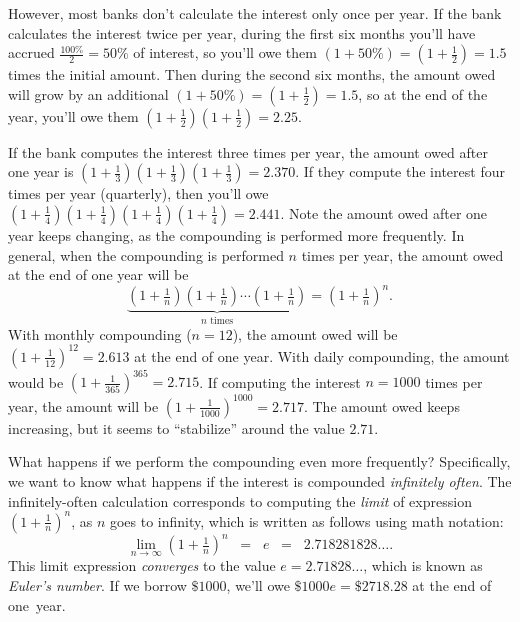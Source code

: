 		However,
		most banks don't calculate the interest only once per year.
		If the bank calculates the interest twice per year,
		during the first six months you'll have accrued $\frac{100\%}{2} = 50\%$ of interest,
		so you'll owe them $(1+50\%) = (1+\frac{1}{2}) = 1.5$ times the initial amount.
		Then during the second six months,
		the amount owed will grow by an additional $(1+50\%) = (1+\frac{1}{2}) = 1.5$,
		so at the end of the year,
		you'll owe them $(1+\frac{1}{2})(1+\frac{1}{2}) = 2.25$.

		If the bank computes the interest three times per year,
		the amount owed after one year is $(1+\frac{1}{3})(1+\frac{1}{3})(1+\frac{1}{3}) = 2.370$.
		If they compute the interest four times per year (quarterly),
		then you'll owe $(1+\frac{1}{4})(1+\frac{1}{4})(1+\frac{1}{4})(1+\frac{1}{4})  = 2.441$.
		Note the amount owed after one year keeps changing,
		as the compounding is performed more frequently.
		In general,
		when the compounding is performed $n$ times per year,
		the amount owed at the end of one year will be
		\[
			\underbrace{
			\left(1 + \tfrac{1}{n} \right)
			\left(1 + \tfrac{1}{n} \right)
			\cdots
			\left(1 + \tfrac{1}{n} \right)
			}_{n \text{ times}}
			= 
			\left(1 + \tfrac{1}{n} \right)^{\!n}.
		\]
		With monthly compounding ($n=12$),
		the amount owed will be $(1 + \tfrac{1}{12})^{12} = 2.613$
		at the end of one year.
		With daily compounding,
		the amount would be $(1 + \tfrac{1}{365})^{365} = 2.715$.
		If computing the interest $n=1000$ times per year,
		the amount will be $(1 + \tfrac{1}{1000})^{1000} = 2.717$.
		The amount owed keeps increasing,
		but it seems to ``stabilize'' around the value $2.71$.

		What happens if we perform the compounding even more frequently?
		Specifically,
		we want to know what happens if the interest is compounded \emph{infinitely often}.
		The infinitely-often calculation corresponds
		to computing the \emph{limit} of expression  $(1 + \frac{1}{n})^n$,
		as $n$ goes to infinity,
		which is written as follows using math notation:
		\[
			\lim_{n\to \infty} \left( 1 + \tfrac{1}{n}\right)^{\!n}
				\;\; = \;\; e
				\;\;= \;\; 2.718281828\ldots.
		\]
		This limit expression \emph{converges} to the value $e = 2.71828\ldots$,
		which is known as \emph{Euler's number}.
		If we borrow $\$1000$,
		we'll owe $\$1000e = \$2718.28$ at the end of one~year.		


